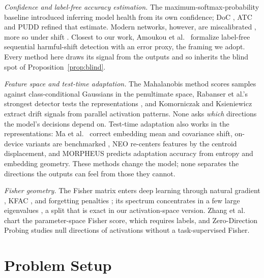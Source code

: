 \documentclass[conference]{IEEEtran}
\begin{document}
\textit{Confidence and label-free accuracy estimation.}
The maximum-softmax-probability baseline \cite{hendrycks2017baseline}
introduced inferring model health from its own confidence; DoC
\cite{guillory2021doc}, ATC \cite{garg2022atc} and PUDD \cite{pudd2025}
refined that estimate. Modern networks, however, are miscalibrated
\cite{guo2017calibration}, more so under shift \cite{ovadia2019trust}. Closest
to our work, Amoukou et al.\ \cite{amoukou2024sequential} formalize label-free
sequential harmful-shift detection with an error proxy, the framing we adopt.
Every method here draws its signal from the outputs and so inherits the blind
spot of Proposition~\ref{prop:blind}.

\textit{Feature space and test-time adaptation.}
The Mahalanobis method \cite{lee2018mahalanobis} scores samples against
class-conditional Gaussians in the penultimate space, Rabanser et al.'s
strongest detector tests the representations \cite{rabanser2019failing}, and
Komorniczak and Ksieniewicz \cite{komorniczak2024parallel} extract drift
signals from parallel activation patterns. None asks \emph{which} directions
the model's decisions depend on. Test-time adaptation also works in the
representations: Ma et al.\ \cite{ma2026pea} correct embedding mean and
covariance shift, on-device variants are benchmarked
\cite{danilowski2026botta}, NEO \cite{murphy2026neo} re-centers features by the
centroid displacement, and MORPHEUS \cite{danilowski2026morpheus} predicts
adaptation accuracy from entropy and embedding geometry. These methods change
the model; none separates the directions the outputs can feel from those they
cannot.

\textit{Fisher geometry.}
The Fisher matrix enters deep learning through natural gradient
\cite{amari1998natural}, KFAC \cite{martens2015kfac}, and forgetting penalties
\cite{kirkpatrick2017overcoming}; its spectrum concentrates in a few large
eigenvalues \cite{karakida2019universal}, a split that is exact in our
activation-space version. Zhang et al.\ \cite{zhang2023score} chart the
parameter-space Fisher score, which requires labels, and Zero-Direction
Probing \cite{pandey2025zdp} studies null directions of activations without a
task-supervised Fisher.

\section{Problem Setup}
\label{sec:setup}
\end{document}
